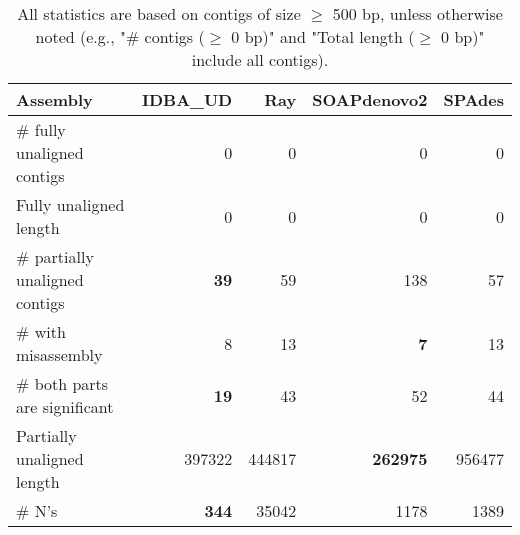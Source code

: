 \documentclass[12pt,a4paper]{article}
\begin{document}
\begin{table}[ht]
\begin{center}
\caption{All statistics are based on contigs of size $\geq$ 500 bp, unless otherwise noted (e.g., "\# contigs ($\geq$ 0 bp)" and "Total length ($\geq$ 0 bp)" include all contigs).}
\begin{tabular}{|l*{4}{|r}|}
\hline
Assembly & IDBA\_UD & Ray & SOAPdenovo2 & SPAdes \\ \hline
\# fully unaligned contigs & 0 & 0 & 0 & 0 \\ \hline
Fully unaligned length & 0 & 0 & 0 & 0 \\ \hline
\# partially unaligned contigs & {\bf 39} & 59 & 138 & 57 \\ \hline
\hspace{5mm}\# with misassembly & 8 & 13 & {\bf 7} & 13 \\ \hline
\hspace{5mm}\# both parts are significant & {\bf 19} & 43 & 52 & 44 \\ \hline
Partially unaligned length & 397322 & 444817 & {\bf 262975} & 956477 \\ \hline
\# N's & {\bf 344} & 35042 & 1178 & 1389 \\ \hline
\end{tabular}
\end{center}
\end{table}
\end{document}
